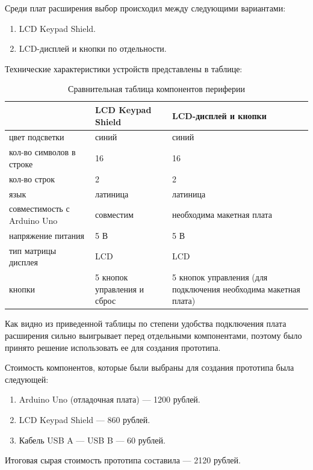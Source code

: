 Среди плат расширения выбор происходил между следующими вариантами:

\begin{enumerate}
    \item LCD Keypad Shield.
    \item LCD-дисплей и кнопки по отдельности.
\end{enumerate}

Технические характеристики устройств представлены в таблице:

\begin{table}[H]
    \centering
    \caption{Сравнительная таблица компонентов периферии}
    \begin{tabular}{|p{4cm}|p{5cm}|p{6cm}|}
        \hline
         & LCD Keypad Shield & LCD-дисплей и кнопки \\ 
         \hline
        цвет подсветки & синий & синий \\ 
        \hline
        кол-во символов в строке & 16 & 16 \\
        \hline
        кол-во строк & 2 & 2 \\
        \hline
        язык & латиница & латиница \\
        \hline
        совместимость с Arduino Uno & совместим & необходима макетная плата \\
        \hline
        напряжение питания & 5 В & 5 В \\
        \hline
        тип матрицы дисплея & LCD & LCD \\
        \hline
        кнопки & 5 кнопок управления и сброс & 5 кнопок управления (для подключения необходима макетная плата) \\
        \hline
    \end{tabular}
    \label{tab:my_label}
\end{table}

Как видно из приведенной таблицы по степени удобства подключения плата расширения сильно выигрывает перед отдельными компонентами, поэтому было принято решение использовать ее для создания прототипа.

Стоимость компонентов, которые были выбраны для создания прототипа была следующей:

\begin{enumerate}
    \item Arduino Uno (отладочная плата) --- 1200 рублей.
    \item LCD Keypad Shield --- 860 рублей.
    \item Кабель USB A --- USB B --- 60 рублей.
\end{enumerate}

Итоговая сырая стоимость прототипа составила --- 2120 рублей.